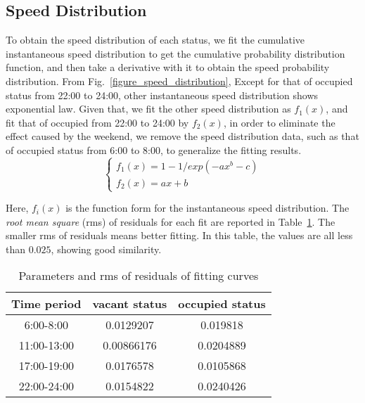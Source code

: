 \subsection{Speed Distribution}
\label{section_speed_modeling}
To obtain the speed distribution of each status, we fit the cumulative instantaneous speed distribution to get the cumulative probability distribution function, and then take a derivative with it to obtain the speed probability distribution. From Fig.~\ref{figure_speed_distribution}, Except for that of occupied status from 22:00 to 24:00, other instantaneous speed distribution shows exponential law. Given that, we fit the other speed distribution as $f_1(x)$, and fit that of occupied from 22:00 to 24:00 by $f_2(x)$, in order to eliminate the effect caused by the weekend, we remove the speed distribution data, such as that of occupied status from 6:00 to 8:00, to generalize the fitting results. 
\begin{equation}\label{formular_ccdf_speed}
\left\{
\begin{array}{ll}
f_1(x) = 1-1/exp(-ax^b-c)\\
f_2(x) = ax+b
\end{array}
\right.
\end{equation}



Here, $f_i(x)$ is the function form for the instantaneous speed distribution. The \emph{root mean square} (rms) of residuals for each fit are reported in Table~\ref{table_rms}. The smaller rms of residuals means better fitting. In this table, the values are all less than $0.025$, showing good similarity.

\begin{table}
\caption{Parameters and rms of residuals of fitting curves}\label{table_rms}
\centering
\begin{tabular}{c|c|c}
  \hline
  Time period  & vacant status & occupied status \\
  \hline
6:00-8:00   &0.0129207 & 0.019818 \\
11:00-13:00 &0.00866176 & 0.0204889 \\
17:00-19:00 &0.0176578 & 0.0105868 \\
22:00-24:00 &0.0154822 & 0.0240426 \\
  \hline
\end{tabular}
\end{table}


